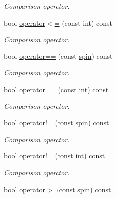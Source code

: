 \begin{DoxyCompactItemize}
\begin{DoxyCompactList}\small\item\em Comparison operator. \end{DoxyCompactList}\item 
\hypertarget{a00514_a102824635dbdeb84b9499cc7a8e002ad}{}bool \hyperlink{a00514_a102824635dbdeb84b9499cc7a8e002ad}{operator$<$=} (const int) const \label{a00514_a102824635dbdeb84b9499cc7a8e002ad}

\begin{DoxyCompactList}\small\item\em Comparison operator. \end{DoxyCompactList}\item 
\hypertarget{a00514_a9754c7f96977344f3aed8db8d4bfc199}{}bool \hyperlink{a00514_a9754c7f96977344f3aed8db8d4bfc199}{operator==} (const \hyperlink{a00514}{spin}) const \label{a00514_a9754c7f96977344f3aed8db8d4bfc199}

\begin{DoxyCompactList}\small\item\em Comparison operator. \end{DoxyCompactList}\item 
\hypertarget{a00514_ac587da3709184b3f6926c4191d96fdc2}{}bool \hyperlink{a00514_ac587da3709184b3f6926c4191d96fdc2}{operator==} (const int) const \label{a00514_ac587da3709184b3f6926c4191d96fdc2}

\begin{DoxyCompactList}\small\item\em Comparison operator. \end{DoxyCompactList}\item 
\hypertarget{a00514_a70acc47532264f10d33937224c9d0ff7}{}bool \hyperlink{a00514_a70acc47532264f10d33937224c9d0ff7}{operator!=} (const \hyperlink{a00514}{spin}) const \label{a00514_a70acc47532264f10d33937224c9d0ff7}

\begin{DoxyCompactList}\small\item\em Comparison operator. \end{DoxyCompactList}\item 
\hypertarget{a00514_a2ab72ec0dd126d99407f7e83459b1a07}{}bool \hyperlink{a00514_a2ab72ec0dd126d99407f7e83459b1a07}{operator!=} (const int) const \label{a00514_a2ab72ec0dd126d99407f7e83459b1a07}

\begin{DoxyCompactList}\small\item\em Comparison operator. \end{DoxyCompactList}\item 
\hypertarget{a00514_add363e45f83aaaec04d337886dde0f71}{}bool \hyperlink{a00514_add363e45f83aaaec04d337886dde0f71}{operator$>$} (const \hyperlink{a00514}{spin}) const \label{a00514_add363e45f83aaaec04d337886dde0f71}


\end{DoxyCompactItemize}
